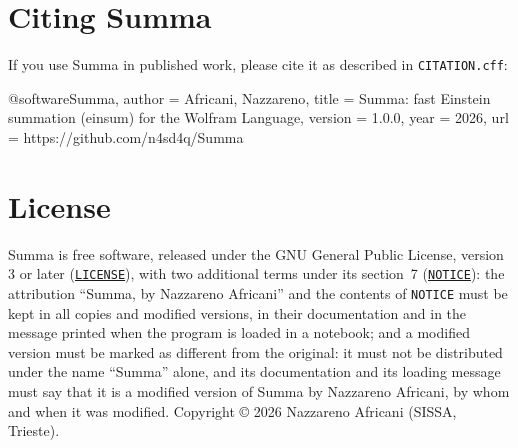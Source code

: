 \documentclass[11pt,a4paper]{article}
\begin{document}
\section{Citing Summa}
If you use Summa in published work, please cite it as described in \texttt{CITATION.cff}:
\begin{code}
@software{Summa,
  author  = {Africani, Nazzareno},
  title   = {Summa: fast Einstein summation (einsum) for the Wolfram Language},
  version = {1.0.0},
  year    = {2026},
  url     = {https://github.com/n4sd4q/Summa}
}
\end{code}

\section{License}
Summa is free software, released under the GNU General Public License, version 3 or later
(\href{https://github.com/n4sd4q/Summa/blob/main/LICENSE}{\texttt{LICENSE}}), with two additional terms under its
section~7 (\href{https://github.com/n4sd4q/Summa/blob/main/NOTICE}{\texttt{NOTICE}}): the attribution ``Summa, by Nazzareno
Africani'' and the contents of \texttt{NOTICE} must be kept in all copies and modified versions, in their documentation and in
the message printed when the program is loaded in a notebook; and a modified version must be marked as different from the
original: it must not be distributed under the name ``Summa'' alone, and its documentation and its loading message must say
that it is a modified version of Summa by Nazzareno Africani, by whom and when it was modified. Copyright \copyright{} 2026
Nazzareno Africani (SISSA, Trieste).
\end{document}
